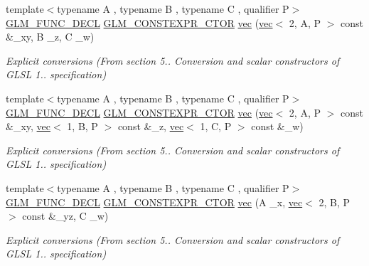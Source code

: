 \begin{DoxyCompactItemize}
\item 
{\footnotesize template$<$typename A , typename B , typename C , qualifier P$>$ }\\\mbox{\hyperlink{setup_8hpp_ab2d052de21a70539923e9bcbf6e83a51}{G\+L\+M\+\_\+\+F\+U\+N\+C\+\_\+\+D\+E\+CL}} \mbox{\hyperlink{setup_8hpp_ad34178a09666081abdb573c14d1f4a5a}{G\+L\+M\+\_\+\+C\+O\+N\+S\+T\+E\+X\+P\+R\+\_\+\+C\+T\+OR}} \mbox{\hyperlink{structglm_1_1vec_3_014_00_01_t_00_01_q_01_4_a973c9293d62029453e5e2619061f84e8}{vec}} (\mbox{\hyperlink{structglm_1_1vec}{vec}}$<$ 2, A, P $>$ const \&\+\_\+xy, B \+\_\+z, C \+\_\+w)
\begin{DoxyCompactList}\small\item\em Explicit conversions (From section 5.. Conversion and scalar constructors of G\+L\+SL 1.. specification) \end{DoxyCompactList}\item 
{\footnotesize template$<$typename A , typename B , typename C , qualifier P$>$ }\\\mbox{\hyperlink{setup_8hpp_ab2d052de21a70539923e9bcbf6e83a51}{G\+L\+M\+\_\+\+F\+U\+N\+C\+\_\+\+D\+E\+CL}} \mbox{\hyperlink{setup_8hpp_ad34178a09666081abdb573c14d1f4a5a}{G\+L\+M\+\_\+\+C\+O\+N\+S\+T\+E\+X\+P\+R\+\_\+\+C\+T\+OR}} \mbox{\hyperlink{structglm_1_1vec_3_014_00_01_t_00_01_q_01_4_ae72bf7baa584d35cfadd6d3be750518b}{vec}} (\mbox{\hyperlink{structglm_1_1vec}{vec}}$<$ 2, A, P $>$ const \&\+\_\+xy, \mbox{\hyperlink{structglm_1_1vec}{vec}}$<$ 1, B, P $>$ const \&\+\_\+z, \mbox{\hyperlink{structglm_1_1vec}{vec}}$<$ 1, C, P $>$ const \&\+\_\+w)
\begin{DoxyCompactList}\small\item\em Explicit conversions (From section 5.. Conversion and scalar constructors of G\+L\+SL 1.. specification) \end{DoxyCompactList}\item 
{\footnotesize template$<$typename A , typename B , typename C , qualifier P$>$ }\\\mbox{\hyperlink{setup_8hpp_ab2d052de21a70539923e9bcbf6e83a51}{G\+L\+M\+\_\+\+F\+U\+N\+C\+\_\+\+D\+E\+CL}} \mbox{\hyperlink{setup_8hpp_ad34178a09666081abdb573c14d1f4a5a}{G\+L\+M\+\_\+\+C\+O\+N\+S\+T\+E\+X\+P\+R\+\_\+\+C\+T\+OR}} \mbox{\hyperlink{structglm_1_1vec_3_014_00_01_t_00_01_q_01_4_a888477e1cf2c8bf5418e99450ea850c1}{vec}} (A \+\_\+x, \mbox{\hyperlink{structglm_1_1vec}{vec}}$<$ 2, B, P $>$ const \&\+\_\+yz, C \+\_\+w)
\begin{DoxyCompactList}\small\item\em Explicit conversions (From section 5.. Conversion and scalar constructors of G\+L\+SL 1.. specification) \end{DoxyCompactList}\item 

\end{DoxyCompactItemize}
